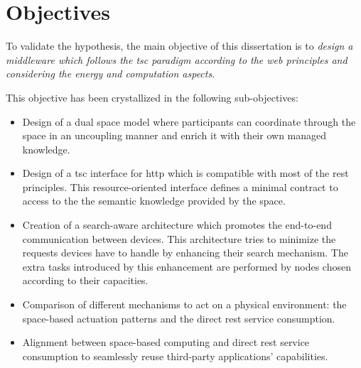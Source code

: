 \section{Objectives}

To validate the hypothesis, the main objective of this dissertation is to
\emph{design a middleware which follows the \ac{tsc} paradigm according to the web principles and considering the energy and computation aspects}.

This objective has been crystallized in the following sub-objectives:

\begin{itemize} %
  \item Design of a dual space model where participants can coordinate through the space in an uncoupling manner and enrich it with their own managed knowledge.
  \item Design of a \ac{tsc} interface for \ac{http} which is compatible with most of the \ac{rest} principles.
	This resource-oriented interface defines a minimal contract to access to the the semantic knowledge provided by the space. %
  \item Creation of a search-aware architecture which promotes the end-to-end communication between devices. %
	This architecture tries to minimize the requests devices have to handle by enhancing their search mechanism.
	The extra tasks introduced by this enhancement are performed by nodes chosen according to their capacities.
  \item Comparison of different mechanisms to act on a physical environment: the space-based actuation patterns and the direct \ac{rest} service consumption.
  \item Alignment between space-based computing and direct \ac{rest} service consumption to seamlessly reuse third-party applications' capabilities.
\end{itemize}